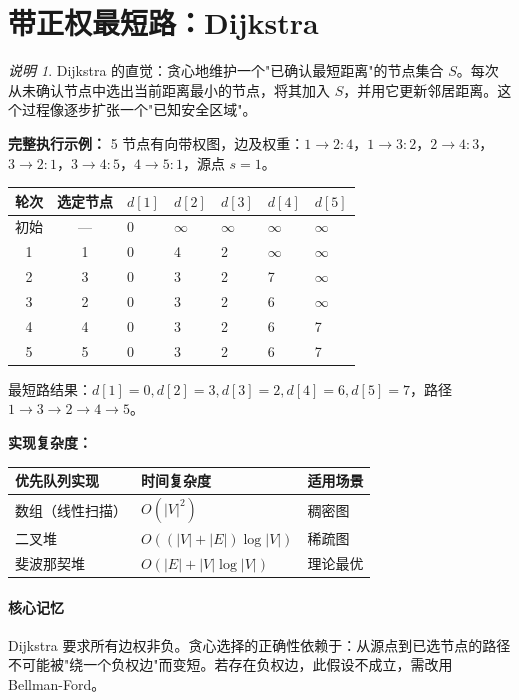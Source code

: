 \documentclass[UTF8,openany,12pt]{ctexbook}
\theoremstyle{remark}
\newtheorem{remark}{说明}[chapter]
\newcommand{\keypoint}[1]{\paragraph{核心记忆}#1}
\begin{document}
\section{带正权最短路：Dijkstra}

\begin{remark}
Dijkstra 的直觉：贪心地维护一个"已确认最短距离"的节点集合 $S$。每次从未确认节点中选出当前距离最小的节点，将其加入 $S$，并用它更新邻居距离。这个过程像逐步扩张一个"已知安全区域"。
\end{remark}

\textbf{完整执行示例：} 5 节点有向带权图，边及权重：$1\to2: 4$，$1\to3: 2$，$2\to4: 3$，$3\to2: 1$，$3\to4: 5$，$4\to5: 1$，源点 $s=1$。

\begin{center}
\begin{tabular}{@{}cclllll@{}}
\toprule
轮次 & 选定节点 & $d[1]$ & $d[2]$ & $d[3]$ & $d[4]$ & $d[5]$ \\
\midrule
初始 & --- & 0 & $\infty$ & $\infty$ & $\infty$ & $\infty$ \\
1    & 1   & 0 & 4        & 2        & $\infty$ & $\infty$ \\
2    & 3   & 0 & 3        & 2        & 7        & $\infty$ \\
3    & 2   & 0 & 3        & 2        & 6        & $\infty$ \\
4    & 4   & 0 & 3        & 2        & 6        & 7        \\
5    & 5   & 0 & 3        & 2        & 6        & 7        \\
\bottomrule
\end{tabular}
\end{center}

最短路结果：$d[1]=0, d[2]=3, d[3]=2, d[4]=6, d[5]=7$，路径 $1\to3\to2\to4\to5$。

\textbf{实现复杂度：}

\begin{center}
\begin{tabular}{@{}lll@{}}
\toprule
优先队列实现 & 时间复杂度 & 适用场景 \\
\midrule
数组（线性扫描） & $O(|V|^2)$ & 稠密图 \\
二叉堆 & $O((|V|+|E|)\log|V|)$ & 稀疏图 \\
斐波那契堆 & $O(|E| + |V|\log|V|)$ & 理论最优 \\
\bottomrule
\end{tabular}
\end{center}

\keypoint{Dijkstra 要求所有边权非负。贪心选择的正确性依赖于：从源点到已选节点的路径不可能被"绕一个负权边"而变短。若存在负权边，此假设不成立，需改用 Bellman-Ford。}
\end{document}
